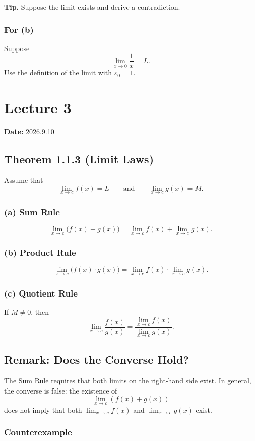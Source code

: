 \documentclass[12pt]{article}
\begin{document}
\textbf{Tip.} Suppose the limit exists and derive a contradiction.

\subsubsection*{For (b)}
Suppose
\[
\lim_{x\to0}\frac{1}{x}=L.
\]
Use the definition of the limit with $\varepsilon_0=1$.

\section*{Lecture 3}
\textbf{Date:} 2026.9.10

\subsection*{Theorem 1.1.3 (Limit Laws)}

Assume that
\[
\lim_{x\to c}f(x)=L
\qquad\text{and}\qquad
\lim_{x\to c}g(x)=M.
\]

\subsubsection*{(a) Sum Rule}
\[
\lim_{x\to c}\bigl(f(x)+g(x)\bigr)
=\lim_{x\to c}f(x)+\lim_{x\to c}g(x).
\]

\subsubsection*{(b) Product Rule}
\[
\lim_{x\to c}\bigl(f(x)\cdot g(x)\bigr)
=\lim_{x\to c}f(x)\cdot\lim_{x\to c}g(x).
\]

\subsubsection*{(c) Quotient Rule}

If $M\ne0$, then
\[
\lim_{x\to c}\frac{f(x)}{g(x)}
=\frac{\displaystyle\lim_{x\to c}f(x)}
{\displaystyle\lim_{x\to c}g(x)}.
\]

\subsection*{Remark: Does the Converse Hold?}

The Sum Rule requires that both limits on the right-hand side exist. In
general, the converse is false: the existence of
\[
\lim_{x\to c}(f(x)+g(x))
\]
does not imply that both $\lim_{x\to c}f(x)$ and $\lim_{x\to c}g(x)$ exist.

\subsubsection*{Counterexample}
\end{document}
